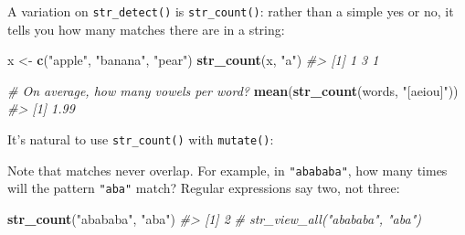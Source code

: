 \documentclass[]{book}
\newenvironment{Shaded}{\begin{snugshade}}{\end{snugshade}}
\newcommand{\KeywordTok}[1]{\textcolor[rgb]{0.13,0.29,0.53}{\textbf{{#1}}}}
\newcommand{\DataTypeTok}[1]{\textcolor[rgb]{0.13,0.29,0.53}{{#1}}}
\newcommand{\StringTok}[1]{\textcolor[rgb]{0.31,0.60,0.02}{{#1}}}
\newcommand{\CommentTok}[1]{\textcolor[rgb]{0.56,0.35,0.01}{\textit{{#1}}}}
\newcommand{\NormalTok}[1]{{#1}}
\begin{document}
A variation on \texttt{str\_detect()} is \texttt{str\_count()}: rather
than a simple yes or no, it tells you how many matches there are in a
string:

\begin{Shaded}
\begin{Highlighting}[]
\NormalTok{x <-}\StringTok{ }\KeywordTok{c}\NormalTok{(}\StringTok{"apple"}\NormalTok{, }\StringTok{"banana"}\NormalTok{, }\StringTok{"pear"}\NormalTok{)}
\KeywordTok{str_count}\NormalTok{(x, }\StringTok{"a"}\NormalTok{)}
\CommentTok{#> [1] 1 3 1}

\CommentTok{# On average, how many vowels per word?}
\KeywordTok{mean}\NormalTok{(}\KeywordTok{str_count}\NormalTok{(words, }\StringTok{"[aeiou]"}\NormalTok{))}
\CommentTok{#> [1] 1.99}
\end{Highlighting}
\end{Shaded}

It's natural to use \texttt{str\_count()} with \texttt{mutate()}:

\begin{Shaded}
\end{Shaded}

Note that matches never overlap. For example, in \texttt{"abababa"}, how
many times will the pattern \texttt{"aba"} match? Regular expressions
say two, not three:

\begin{Shaded}
\begin{Highlighting}[]
\KeywordTok{str_count}\NormalTok{(}\StringTok{"abababa"}\NormalTok{, }\StringTok{"aba"}\NormalTok{)}
\CommentTok{#> [1] 2}
\CommentTok{# str_view_all("abababa", "aba")}
\end{Highlighting}
\end{Shaded}
\end{document}
